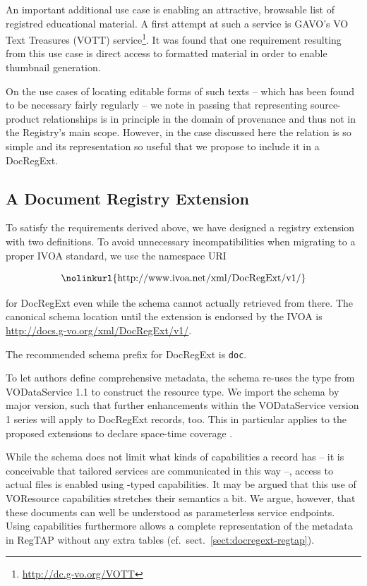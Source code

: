 \documentclass{ivoa}
\begin{document}
An important additional use case is enabling an attractive, browsable
list of registred educational material.  A first attempt at such a
service is GAVO's VO Text Treasures (VOTT)
service\footnote{\url{http://dc.g-vo.org/VOTT}}.  It was found that one
requirement resulting from this use case is direct access to formatted
material in order to enable thumbnail generation.

On the use cases of locating editable forms of such texts – which
has been found to be necessary fairly regularly – we note in passing
that representing source-product relationships is in principle in the
domain of provenance and thus not in the Registry's main scope. However, in
the case discussed here the relation is so simple and its representation
so useful that we propose to include it in a DocRegExt.

\subsection{A Document Registry Extension}


\label{sect:regext-ext}

To satisfy the requirements derived above, we have designed a registry extension with
two definitions. 
To avoid unnecessary incompatibilities when migrating to a proper IVOA
standard, we use the namespace URI

$$\hbox{\nolinkurl{http://www.ivoa.net/xml/DocRegExt/v1/}}$$

for DocRegExt even while the schema cannot actually retrieved from
there.  The canonical schema location until the extension is endorsed by
the IVOA is \url{http://docs.g-vo.org/xml/DocRegExt/v1/}.

The recommended schema prefix for DocRegExt is \texttt{doc}.

To let authors define comprehensive metadata, the schema
re-uses the  type
from VODataService 1.1 \citep{2010ivoa.spec.1202P} to construct
the  resource type.  We import the schema by major
version, such that further enhancements within the VODataService version
1 series will apply to DocRegExt records, too.  This in particular
applies to the proposed extensions to declare space-time coverage
\citep{note:regstc}.

While the schema does not limit what kinds of capabilities a
 record has -- it is conceivable that tailored
services are communicated in this way --, access to actual files is
enabled using -typed capabilities.  It may be
argued that this use of VOResource capabilities stretches their
semantics a bit.  We argue, however, that these documents can well be
understood as parameterless service endpoints.  Using capabilities
furthermore allows a complete representation of the metadata in RegTAP
without any extra tables (cf.~sect.~\ref{sect:docregext-regtap}).
\end{document}
